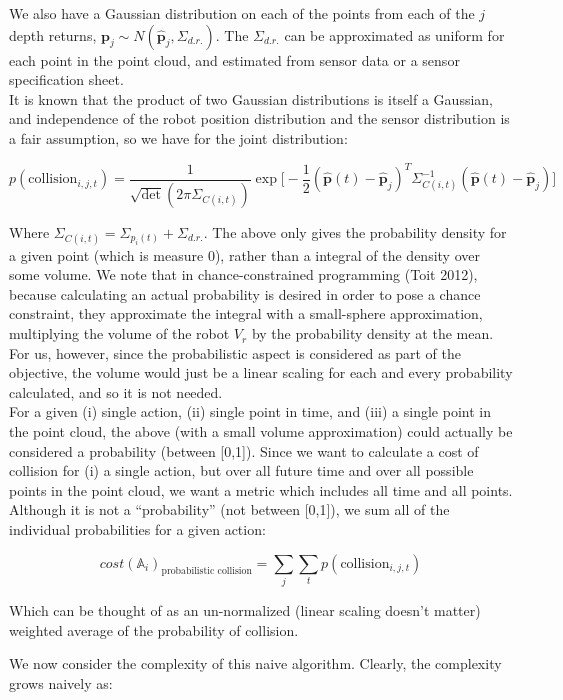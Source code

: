 \documentclass[paper=a4, fontsize=11pt]{scrartcl} %
\numberwithin{equation}{section} %
\numberwithin{figure}{section} %
\numberwithin{table}{section} %
\begin{document}
We also have a Gaussian distribution on each of the points from each of the $j$ depth returns, $\mathbf{p}_{j} \sim N(\mathbf{\hat{p}}_{j}, \Sigma_{d.r.})$.  The $\Sigma_{d.r.}$ can be approximated as uniform for each point in the point cloud, and estimated from sensor data or a sensor specification sheet.\\

It is known that the product of two Gaussian distributions is itself a Gaussian, and independence of the robot position distribution and the sensor distribution is a fair assumption, so we have for the joint distribution:

$$ p(\text{collision}_{i,j,t}) = \frac{1}{\sqrt{\text{det}}(2 \pi \Sigma_{C(i, t)})} \exp \big[  -\frac{1}{2}(\mathbf{\hat{p}}(t) - \mathbf{\hat{p}}_{j})^T \Sigma_{C(i, t)}^{-1} (\mathbf{\hat{p}}(t) - \mathbf{\hat{p}}_{j}) \big] $$

Where $\Sigma_{C(i, t)} = \Sigma_{p_i(t)} + \Sigma_{d.r.}$.  The above only gives the probability density for a given point (which is measure 0), rather than a integral of the density over some volume.  We note that in chance-constrained programming (Toit 2012), because calculating an actual probability is desired in order to pose a chance constraint, they approximate the integral with a small-sphere approximation, multiplying the volume of the robot $V_r$ by the probability density at the mean.  For us, however, since the probabilistic aspect is considered as part of the objective, the volume would just be a linear scaling for each and every probability calculated, and so it is not needed.\\

For a given (i) single action, (ii) single point in time, and (iii) a single point in the point cloud, the above (with a small volume approximation) could actually be considered a probability (between [0,1]).  Since we want to calculate a cost of collision for (i) a single action, but over all future time and over all possible points in the point cloud, we want a metric which includes all time and all points.  Although it is not a ``probability'' (not between [0,1]), we sum all of the individual probabilities for a given action:

$$cost(\mathbb{A}_i)_{\text{probabilistic collision}} = \sum_j \sum_t p(\text{collision}_{i,j,t}) $$

Which can be thought of as an un-normalized (linear scaling doesn't matter) weighted average of the probability of collision.

We now consider the complexity of this naive algorithm.  Clearly, the complexity grows naively as:
\end{document}
